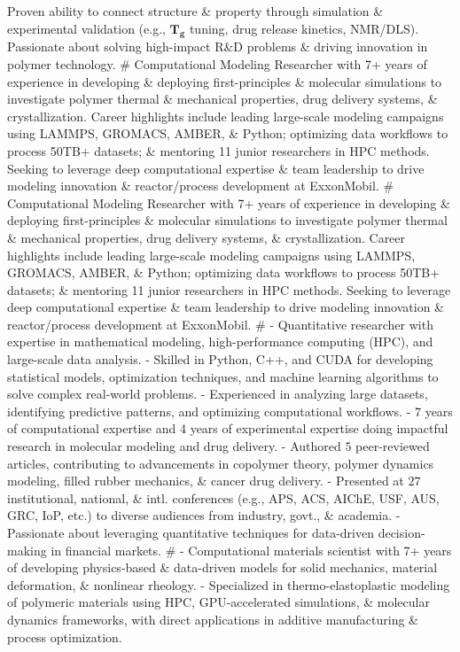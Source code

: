 Proven ability to connect structure \& property through simulation \& experimental validation (e.g., $\bm{T_g}$ tuning, drug release kinetics, NMR/DLS).
Passionate about solving high-impact R\&D problems \& driving innovation in polymer technology.
#
Computational Modeling Researcher with 7+ years of experience in developing \& deploying first-principles \& molecular simulations to investigate polymer thermal \& mechanical properties, drug delivery systems, \& crystallization.
Career highlights include leading large-scale modeling campaigns using LAMMPS, GROMACS, AMBER, \& Python; optimizing data workflows to process 50TB+ datasets; \& mentoring 11 junior researchers in HPC methods.
Seeking to leverage deep computational expertise \& team leadership to drive modeling innovation \& reactor/process development at ExxonMobil.
#
Computational Modeling Researcher with 7+ years of experience in developing \& deploying first-principles \& molecular simulations to investigate polymer thermal \& mechanical properties, drug delivery systems, \& crystallization.
Career highlights include leading large-scale modeling campaigns using LAMMPS, GROMACS, AMBER, \& Python; optimizing data workflows to process 50TB+ datasets; \& mentoring 11 junior researchers in HPC methods.
Seeking to leverage deep computational expertise \& team leadership to drive modeling innovation \& reactor/process development at ExxonMobil.
#
- Quantitative researcher with expertise in mathematical modeling, high-performance computing (HPC), and large-scale data analysis. 
- Skilled in Python, C++, and CUDA for developing statistical models, optimization techniques, and machine learning algorithms to solve complex real-world problems.
- Experienced in analyzing large datasets, identifying predictive patterns, and optimizing computational workflows.
- 7 years of computational expertise and 4 years of experimental expertise doing impactful research in molecular modeling and drug delivery.
- Authored $5$ peer-reviewed articles, contributing to advancements in copolymer theory, polymer dynamics modeling, filled rubber mechanics, \& cancer drug delivery.
- Presented at $27$ institutional, national, \& intl. conferences (e.g., APS, ACS, AIChE, USF, AUS, GRC, IoP, etc.) to diverse audiences from industry, govt., \& academia.
- Passionate about leveraging quantitative techniques for data-driven decision-making in financial markets.
#
- Computational materials scientist with 7+ years of developing physics-based \& data-driven models for solid mechanics, material deformation, \& nonlinear rheology.
- Specialized in thermo-elastoplastic modeling of polymeric materials using HPC, GPU-accelerated simulations, \& molecular dynamics frameworks, with direct applications in additive manufacturing \& process optimization.
